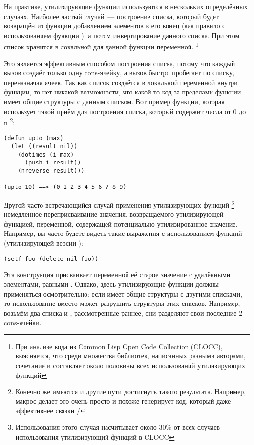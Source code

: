 На практике, утилизирующие функции используются в нескольких определённых
случаях. Наиболее частый случай~--- построение списка, который будет возвращён из функции
добавлением элементов в его конец (как правило с использованием функции ), а
потом инвертирование данного списка. При этом список хранится в локальной для данной
функции переменной. \footnote{При анализе кода из Common Lisp Open Code Collection
  (CLOCC), выясняется, что среди множества библиотек, написанных разными авторами,
  сочетание  и  составляет около половины всех использований
  утилизирующих функций}

Это является эффективным способом построения списка, потому что каждый вызов 
создаёт только одну cons-ячейку, а вызов  быстро пробегает по списку,
переназначая  ячеек. Так как список создаётся в локальной переменной внутри
функции, то нет никакой возможности, что какой-то код за пределами функции имеет общие
структуры с данным списком. Вот пример функции, которая использует такой приём для
построения списка, который содержит числа от 0 до n \footnote{Конечно же имеются и другие
  пути достигнуть такого результата. Например, макрос  делает это очень просто
  и похоже генерирует код, который даже эффективнее связки /}:

\begin{lstlisting}
(defun upto (max)
  (let ((result nil))
    (dotimes (i max)
      (push i result))
    (nreverse result)))

(upto 10) ==> (0 1 2 3 4 5 6 7 8 9)
\end{lstlisting}

Другой часто встречающийся случай применения утилизирующих функций \footnote{Использования
  этого случая насчитывает около 30\% от всех случаев использования утилизирующий функций
  в CLOCC} - немедленное переприсваивание значения, возвращаемого утилизирующей функцией,
переменной, содержащей потенциально утилизированное значение. Например, вы часто будете
видеть такие выражения с использованием функций  (утилизирующей версии
):

\begin{lstlisting}
(setf foo (delete nil foo))
\end{lstlisting}

Эта конструкция присваивает переменной  её старое значение с удалёнными
элементами, равными . Однако, здесь утилизирующие функции должны применяться
осмотрительно: если  имеет общие структуры с другими списками, то использование
 вместо  может разрушить структуры этих списков. Например,
возьмём два списка  и , рассмотренные раннее, они разделяют свои
последние 2 cons-ячейки.

